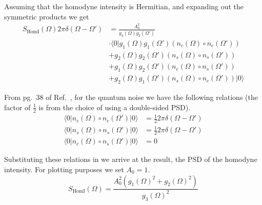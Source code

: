 \documentclass[aps,pra,superscriptaddress,reprint,nofootinbib]{revtex4-1}
\begin{document}
Assuming that the homodyne intensity is Hermitian, and expanding out the symmetric products we get
\begin{align}
S_\mathrm{HomI}(\Omega) 2 \pi \delta(\Omega - \Omega') &= \frac{A_0^2}{g_3(\Omega) g_3(\Omega')} \\
&\cdot \langle0| g_1(\Omega) g_1(\Omega') (n_c(\Omega) \circ n_c(\Omega'))\nonumber\\
&+ g_2(\Omega) g_2(\Omega') (n_s(\Omega) \circ n_s(\Omega')) \nonumber\\
&+ g_1(\Omega) g_2(\Omega') (n_c(\Omega) \circ n_s(\Omega'))\nonumber \\
&+ g_2(\Omega) g_1(\Omega') (n_s(\Omega) \circ n_c(\Omega')) |0\rangle\nonumber
\end{align}


From pg.~38 of Ref.~\cite{Danilishin_2012}, for the quantum noise we have the following relations (the factor of $\frac{1}{2}$ is from the choice of using a double-sided PSD).
\begin{align}
\langle0|n_c(\Omega) \circ n_c(\Omega')|0\rangle &= \frac{1}{2} 2 \pi \delta(\Omega - \Omega') \\
\langle0|n_s(\Omega) \circ n_s(\Omega')|0\rangle &= \frac{1}{2} 2 \pi \delta(\Omega - \Omega') \nonumber\\
\langle0|n_c(\Omega) \circ n_s(\Omega')|0\rangle &= 0\nonumber
\end{align}

Substituting these relations in we arrive at the result, the PSD of the homodyne intensity. For plotting purposes we set $A_0 = 1$.
\begin{equation}
S_\mathrm{HomI}(\Omega) = \frac{A_0^2 \left( g_1(\Omega)^2 + g_2(\Omega)^2 \right)}{g_3(\Omega)^2}
\end{equation}


\nocite{*}


\end{document}
